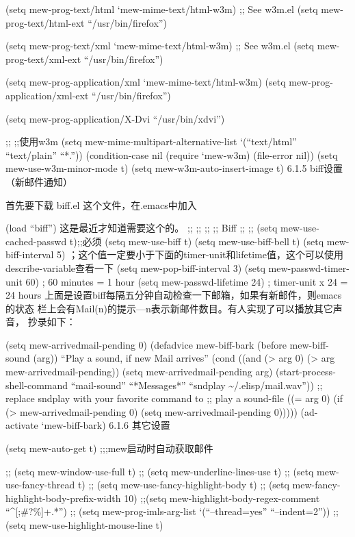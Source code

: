 \documentclass[11pt]{article}
\begin{document}
 (setq mew-prog-text/html         `mew-mime-text/html-w3m) ;; See w3m.el
 (setq mew-prog-text/html-ext     ``/usr/bin/firefox'')

 (setq mew-prog-text/xml         `mew-mime-text/html-w3m) ;; See w3m.el
 (setq mew-prog-text/xml-ext     ``/usr/bin/firefox'')

 (setq mew-prog-application/xml         `mew-mime-text/html-w3m)
 (setq mew-prog-application/xml-ext     ``/usr/bin/firefox'')

(setq mew-prog-application/X-Dvi         ``/usr/bin/xdvi'')

;; ;;使用w3m 
 (setq mew-mime-multipart-alternative-list `(``text/html'' ``text/plain'' ``*.''))
 (condition-case nil
 (require `mew-w3m)
(file-error nil))
(setq mew-use-w3m-minor-mode t)
(setq mew-w3m-auto-insert-image t)
6.1.5 biff设置（新邮件通知）

首先要下载 biff.el 这个文件，在.emacs中加入

(load ``biff'')
这是最近才知道需要这个的。
;; ;;
;; ;; Biff
;; ;; 
(setq mew-use-cached-passwd t);;必须
(setq mew-use-biff t)
(setq mew-use-biff-bell t)
(setq mew-biff-interval 5) ；这个值一定要小于下面的timer-unit和lifetime值，这个可以使用describe-variable查看一下
(setq mew-pop-biff-interval 3)
(setq mew-passwd-timer-unit 60)       ; 60 minutes = 1 hour                                            
(setq mew-passwd-lifetime 24)         ; timer-unit x 24 = 24 hours 
上面是设置biff每隔五分钟自动检查一下邮箱，如果有新邮件，则emacs的状态 栏上会有Mail(n)的提示—n表示新邮件数目。有人实现了可以播放其它声音， 抄录如下：

(setq mew-arrivedmail-pending 0)
(defadvice mew-biff-bark (before mew-biff-sound (arg))
  ``Play a sound, if new Mail arrives''
  (cond ((and (> arg 0) (> arg mew-arrivedmail-pending))
     (setq mew-arrivedmail-pending arg)
     (start-process-shell-command    ``mail-sound''   ``*Messages*''
                                      ``sndplay \~{}/.elisp/mail.wav''))
                  ;; replace sndplay with your favorite command to
                  ;; play a sound-file
    ((= arg 0)
     (if (> mew-arrivedmail-pending 0)
         (setq mew-arrivedmail-pending 0)))))
(ad-activate `mew-biff-bark)
6.1.6 其它设置

(setq mew-auto-get t) ;;;mew启动时自动获取邮件

;; (setq mew-window-use-full t)
;; (setq mew-underline-lines-use t)
;; (setq mew-use-fancy-thread t)
;; (setq mew-use-fancy-highlight-body t)
;; (setq mew-fancy-highlight-body-prefix-width 10)
;;(setq mew-highlight-body-regex-comment ``^[;\#?\%]+.*'')
;; (setq mew-prog-imls-arg-list `(``--thread=yes'' ``--indent=2''))
;;(setq mew-use-highlight-mouse-line t)
\end{document}
